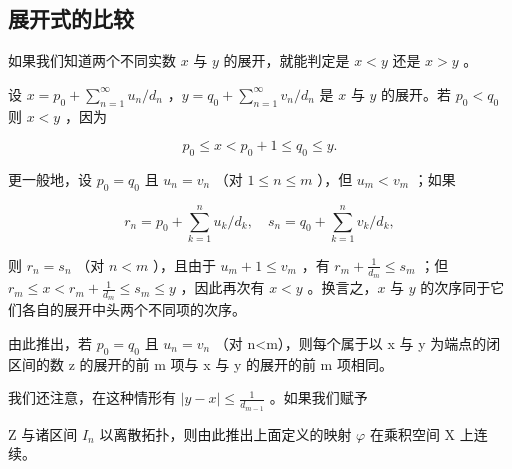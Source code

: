 \subsection{展开式的比较}

如果我们知道两个不同实数 \(x\) 与 \(y\) 的展开，就能判定是 \(x < y\) 还是 \(x > y\) 。

设 \(x = p_0 + \sum_{n=1}^{\infty} u_n / d_n\) ，\(y = q_0 + \sum_{n=1}^{\infty} v_n / d_n\) 是 \(x\) 与 \(y\) 的展开。若 \(p_0 < q_0\) 则 \(x < y\) ，因为

\[
p _ {0} \leqslant x <   p _ {0} + 1 \leqslant q _ {0} \leqslant y.
\]

更一般地，设 \(p_0 = q_0\) 且 \(u_n = v_n\) （对 \(1 \leqslant n \leqslant m\) ），但 \(u_m < v_m\) ；如果

\[
r _ {n} = p _ {0} + \sum_ {k = 1} ^ {n} u _ {k} / d _ {k}, \quad s _ {n} = q _ {0} + \sum_ {k = 1} ^ {n} v _ {k} / d _ {k},
\]

则 \(r_n = s_n\) （对 \(n < m\) ），且由于 \(u_m + 1 \leqslant v_m\) ，有 \(r_m + \frac{1}{d_m} \leqslant s_m\) ；但 \(r_m \leqslant x < r_m + \frac{1}{d_m} \leqslant s_m \leqslant y\) ，因此再次有 \(x < y\) 。换言之，\(x\) 与 \(y\) 的次序同于它们各自的展开中头两个不同项的次序。

由此推出，若 \(p_{0}=q_{0}\) 且 \(u_{n}=v_{n}\) （对 n\textless m），则每个属于以 x 与 y 为端点的闭区间的数 z 的展开的前 m 项与 x 与 y 的展开的前 m 项相同。

我们还注意，在这种情形有 \(|y - x| \leqslant \frac{1}{d_{m-1}}\) 。如果我们赋予

Z 与诸区间 \(I_{n}\) 以离散拓扑，则由此推出上面定义的映射 \(\varphi\) 在乘积空间 X 上连续。

